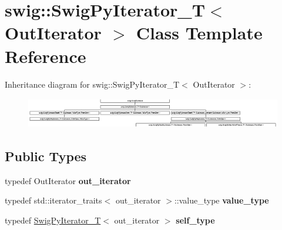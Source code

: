 \hypertarget{classswig_1_1SwigPyIterator__T}{}\section{swig\+:\+:Swig\+Py\+Iterator\+\_\+T$<$ Out\+Iterator $>$ Class Template Reference}
\label{classswig_1_1SwigPyIterator__T}
Inheritance diagram for swig\+:\+:Swig\+Py\+Iterator\+\_\+T$<$ Out\+Iterator $>$\+:\begin{figure}[H]
\begin{center}
\leavevmode
\includegraphics[height=1.313321cm]{classswig_1_1SwigPyIterator__T}
\end{center}
\end{figure}
\subsection*{Public Types}
\begin{DoxyCompactItemize}
\item 
\mbox{\label{classswig_1_1SwigPyIterator__T_aec35545038c3d804975a147253f061e4}} 
typedef Out\+Iterator {\bfseries out\+\_\+iterator}
\item 
\mbox{\label{classswig_1_1SwigPyIterator__T_a1441e2409c41706ad7aee977165f675e}} 
typedef std\+::iterator\+\_\+traits$<$ out\+\_\+iterator $>$\+::value\+\_\+type {\bfseries value\+\_\+type}
\item 
\mbox{\label{classswig_1_1SwigPyIterator__T_af10eb8078eb41f1dbca3701f27bd8e73}} 
typedef \mbox{\hyperlink{classswig_1_1SwigPyIterator__T}{Swig\+Py\+Iterator\+\_\+T}}$<$ out\+\_\+iterator $>$ {\bfseries self\+\_\+type}
\end{DoxyCompactItemize}
